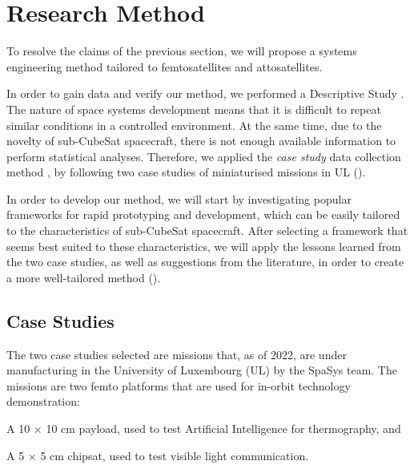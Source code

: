 \documentclass[]{iac}
\begin{document}
\section{Research Method}

To resolve the claims of the previous section, we will propose a systems engineering method \autocite{gerrike_what_2017} tailored to femtosatellites and attosatellites.

In order to gain data and verify our method, we performed a Descriptive Study \autocite{blessing_drm_2009}. The nature of space systems development means that it is difficult to repeat similar conditions in a controlled environment. At the same time, due to the novelty of sub-CubeSat spacecraft, there is not enough available information to perform statistical analyses. Therefore, we applied the \textit{case study} data collection method \autocite{blessing_drm_2009,yin_case_2014}, by following two case studies of miniaturised missions in UL ().

In order to develop our method, we will start by investigating popular frameworks for rapid prototyping and development, which can be easily tailored to the characteristics of sub-CubeSat spacecraft. After selecting a framework that seems best suited to these characteristics, we will apply the lessons learned from the two case studies, as well as suggestions from the literature, in order to create a more well-tailored method ().

\subsection{Case Studies}
\label{sec:caseintro}


The two case studies selected are missions that, as of 2022, are under manufacturing in the University of Luxembourg (UL) by the SpaSys team. The missions are two femto platforms that are used for in-orbit technology demonstration:
\begin{enumerate*}[label=\alph*)]
\item A 10 \(\times\) 10 cm payload, used to test Artificial Intelligence for thermography, and
\item A 5 \(\times\) 5 cm chipsat, used to test visible light communication.
\end{enumerate*}
\end{document}
